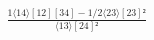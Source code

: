 \documentclass[varwidth, border=5pt]{standalone}
\begin{document}
\begin{my}
$\begin{gathered}
\scriptscriptstyle\frac{1⟨14⟩[12][34]-1/2⟨23⟩[23]²}{⟨13⟩[24]²}
\end{gathered}$
\end{my}
\end{document}

